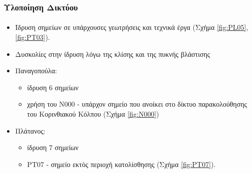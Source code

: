 \documentclass{beamer}
\begin{document}
\begin{frame}\frametitle{Υλοποίηση Δικτύου}\framesubtitle{}
\begin{itemize}
	\item Ίδρυση σημείων σε υπάρχουσες γεωτρήσεις και τεχνικά έργα (Σχήμα \ref{fig:PL05}, \ref{fig:PT03}).
	\item Δυσκολίες στην ίδρυση λόγω της κλίσης και της πυκνής βλάστισης
	\item  Παναγοπούλα:
	\begin{itemize}
		\item ίδρυση 6 σημείων
		\item χρήση του Ν000 - υπάρχον σημείο που ανοίκει στο δίκτυο παρακολούθησης του Κορινθιακού Κόλπου (Σχήμα \ref{fig:N000})
	\end{itemize}
	\item Πλάτανος:
	\begin{itemize}
		\item ίδρυση 7 σημείων
		\item PT07 - σημείο εκτός περιοχή κατολίσθησης (Σχήμα \ref{fig:PT07}).
	\end{itemize}
\end{itemize}
\end{frame}
\end{document}

